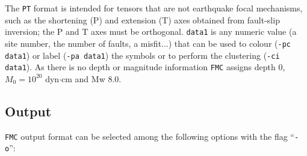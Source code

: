 \documentclass[11pt,a4paper,english]{article}
\numberwithin{equation}{section}
\begin{document}
The \texttt{PT} format is intended for tensors that are not earthquake focal mechanisms, such as the shortening (P) and extension (T) axes obtained from fault-slip inversion; the P and T axes must be orthogonal. \texttt{data1} is any numeric value (a site number, the number of faults, a misfit...) that can be used to colour (\texttt{-pc data1}) or label (\texttt{-pa data1}) the symbols or to perform the clustering (\texttt{-ci data1}). As there is no depth or magnitude information \texttt{FMC} assigns depth 0, $M_0=10^{20}$ dyn$\cdot$cm and Mw 8.0.

\subsection{Output}
\label{sec:output}

\texttt{FMC} output format can be selected among the following options with the flag ``\texttt{-o}'':
\end{document}

